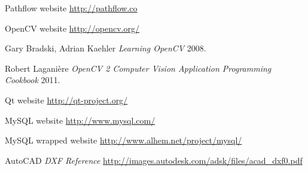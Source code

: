 \begin{thebibliography}{1}
 Pathflow website \url{http://pathflow.co}

 OpenCV website \url{http://opencv.org/}

 Gary Bradski, Adrian Kaehler {\em Learning OpenCV} 2008.

 Robert Laganière {\em OpenCV 2 Computer Vision Application Programming Cookbook} 2011.

 Qt website \url{http://qt-project.org/}

 MySQL website \url{http://www.mysql.com/}

 MySQL wrapped website \url{http://www.alhem.net/project/mysql/}

 AutoCAD {\em DXF Reference} \url{http://images.autodesk.com/adsk/files/acad_dxf0.pdf}

\end{thebibliography}